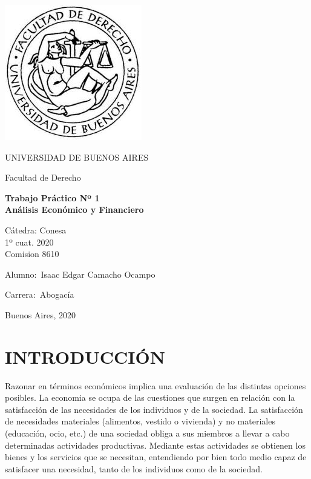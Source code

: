 \documentclass[12pt]{book}
\begin{document}
\thispagestyle{empty}

\vspace{3cm}
\begin {center}

\includegraphics[scale=.4]{descarga.jpeg}

\medskip
UNIVERSIDAD DE BUENOS AIRES

Facultad de Derecho

\vspace{3cm}


\textbf{\large 	Trabajo Práctico Nº 1}
\\
\textbf{\large Análisis Económico y Financiero}

\vspace{4cm}

Cátedra: Conesa
\\
1º cuat. 2020									            
\\
Comision 8610

\vspace{2cm}


\end {center}


\vspace{2.5cm}

\noindent Alumno:\,	Isaac Edgar Camacho Ocampo
 
\noindent Carrera:\,	Abogac\'ia

\vspace{1cm}

\vspace{1cm}

\noindent Buenos Aires, 2020


\tableofcontents

\tableofcontents
\chapter{INTRODUCCIÓN}
Razonar en términos económicos implica una evaluación de las distintas opciones posibles. La economia se ocupa de las cuestiones que surgen en relación con la satisfacción de las necesidades de los individuos y de la sociedad. La satisfacción de necesidades materiales (alimentos, vestido o vivienda) y no materiales (educación, ocio, etc.) de una sociedad obliga a sus miembros a llevar a cabo determinadas actividades productivas. Mediante estas actividades se obtienen los bienes y los servicios que se necesitan, entendiendo por bien todo medio capaz de satisfacer una necesidad, tanto de los individuos como de la sociedad.
\end{document}
